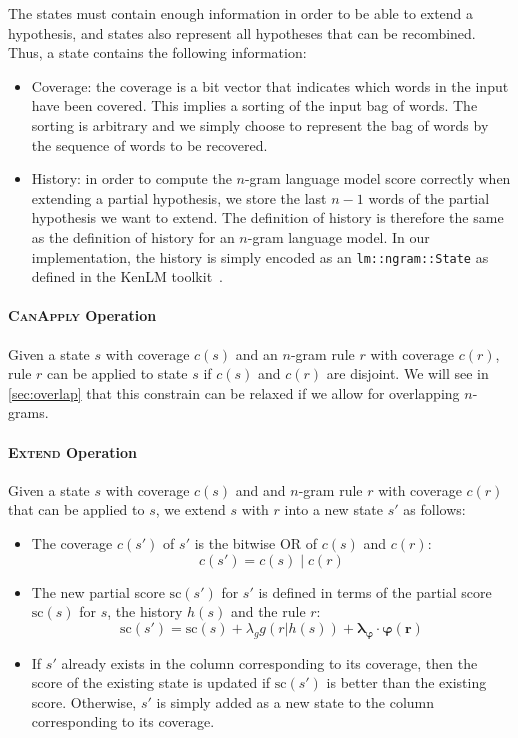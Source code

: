 The states must
contain enough information
in order to be able to extend a hypothesis, and
states also represent
all hypotheses that can be recombined. Thus, a state
contains the following information:
%
\begin{itemize}
  \item Coverage: the coverage is a bit vector that indicates
    which words in the input have been covered. This implies a
    sorting of the input bag of words. The sorting is arbitrary
    and we simply choose to represent the bag of words by the
    sequence of words to be recovered. %
  \item History: in order to compute the $n$-gram language model
    score correctly when extending a partial hypothesis, we
    store the last $n-1$ words of the partial hypothesis we want
    to extend. The definition of history is therefore the same
    as the definition of history for an $n$-gram language model.
    In our implementation, the history is simply encoded as
    an \texttt{lm::ngram::State} as defined in the KenLM
    toolkit~\citep{heafield:2011:WMT}.
\end{itemize}

\paragraph{\textsc{CanApply} Operation}
\label{sec:canApply}

Given a state $s$ with coverage $c(s)$ and an $n$-gram rule $r$ with
coverage $c(r)$, rule $r$ can be applied to state $s$ if $c(s)$ and
$c(r)$ are disjoint. We will see in \autoref{sec:overlap}
that this constrain can be relaxed if we allow for overlapping
$n$-grams.

\paragraph{\textsc{Extend} Operation}

Given a state $s$ with coverage $c(s)$ and and $n$-gram rule $r$
with coverage $c(r)$ that can be applied to $s$, we extend
$s$ with $r$ into a new state $s'$ as follows:
%
\begin{itemize}
  \item The coverage $c(s')$ of $s'$ is the bitwise OR
    of $c(s)$ and $c(r)$:
%
\begin{equation}
  c(s') = c(s) \mid c(r)
\end{equation}
%
  \item The new partial score $\text{sc}(s')$ for $s'$ is defined in terms
    of the partial score $\text{sc}(s)$ for $s$, the history $h(s)$ and the rule $r$:
%
\begin{equation}
  \text{sc}(s') = \text{sc}(s) + \lambda_g g(r | h(s)) + \bm{\lambda_{\varphi}} \cdot \bm{\varphi(r)}
\end{equation}
%
  \item If $s'$ already exists in the column corresponding to its coverage, then
    the score of the existing state is updated if $\text{sc}(s')$ is better than
    the existing score. Otherwise, $s'$ is simply added as a new state to the column corresponding
    to its coverage.
\end{itemize}
%

